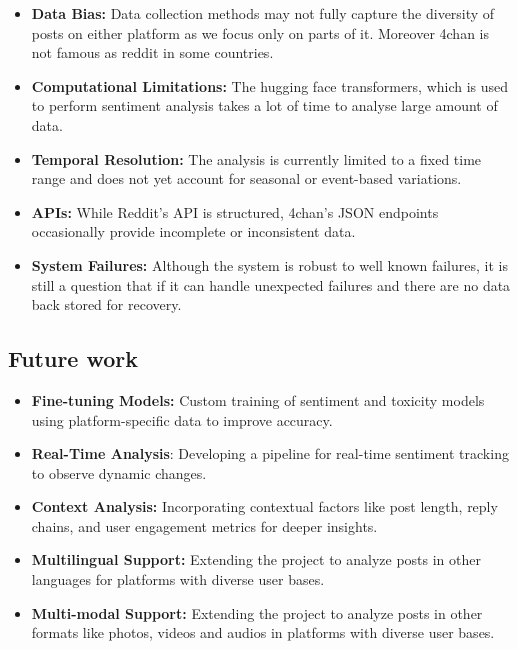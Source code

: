 \documentclass[sigconf]{acmart}
\begin{document}
\begin{itemize}

    \item \textbf{Data Bias:} Data collection methods may not fully capture the diversity of posts on either platform as we focus only on parts of it. Moreover 4chan is not famous as reddit in some countries.
    \item \textbf{Computational Limitations:} The hugging face transformers, which is used to perform sentiment analysis takes a lot of time to analyse large amount of data.
    \item \textbf{Temporal Resolution:} The analysis is currently limited to a fixed time range and does not yet account for seasonal or event-based variations.
    \item \textbf{APIs:} While Reddit’s API is structured, 4chan’s JSON endpoints occasionally provide incomplete or inconsistent data.
    \item \textbf{System Failures:} Although the system is robust to well known failures, it is still a question that if it can handle unexpected failures and there are no data back stored for recovery.
    
\end{itemize}

\subsection{Future work}
\begin{itemize}

    \item \textbf{Fine-tuning Models:} Custom training of sentiment and toxicity models using platform-specific data to improve accuracy.
    
    \item \textbf{Real-Time Analysis}: Developing a pipeline for real-time sentiment tracking to observe dynamic changes.
    
    \item \textbf{Context Analysis:} Incorporating contextual factors like post length, reply chains, and user engagement metrics for deeper insights.
    
    \item \textbf{Multilingual Support:} Extending the project to analyze posts in other languages for platforms with diverse user bases.
    \item \textbf{Multi-modal Support:} Extending the project to analyze posts in other formats like photos, videos and audios in platforms with diverse user bases.

\end{itemize}
\end{document}
